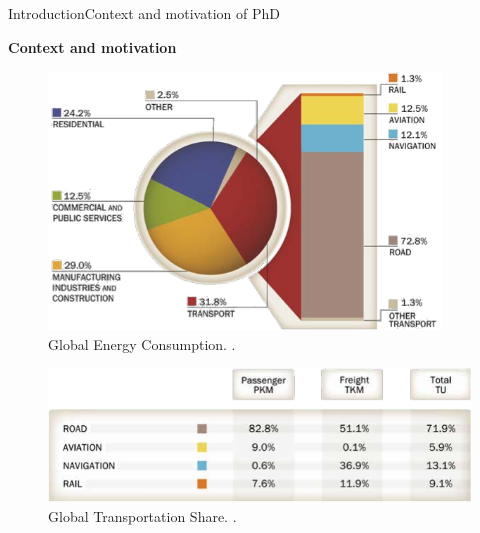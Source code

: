 

\begin{frame}{Introduction}{Context and motivation of PhD}

\begin{block}{\textbf{Context and motivation}}
	\begin{minipage}[t]{0.48\linewidth}
		\begin{figure}[ht!]
			\centering
			\includegraphics[width=0.93\textwidth,keepaspectratio]{figures/1.Intro/iea-uic-energy}
			\caption{Global Energy Consumption. \cite{iea-uic2016}.}
		\end{figure}
	\end{minipage}\hfill
	\begin{minipage}[t]{0.48\linewidth}
		
		\vspace{4.45em}
		\begin{figure}[ht!]
			\centering
			\includegraphics[width=\textwidth,keepaspectratio]{figures/1.Intro/iea-uic-share}
			\caption{Global Transportation Share. \cite{iea-uic2016}.}
		\end{figure}
		
	\end{minipage}
\end{block}
\end{frame}

